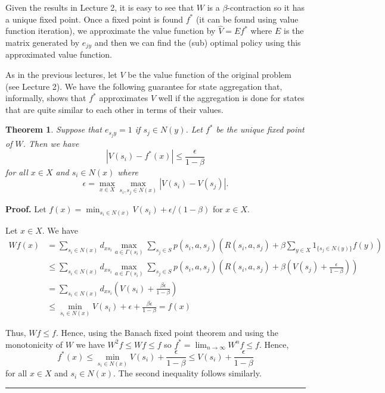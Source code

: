 \documentclass[letter,11pt]{article}
\newtheorem{theorem}{Theorem}[section]
\newenvironment {proof}[1][Proof]{\noindent \textbf {#1.} }{\ \rule {0.5em}{0.5em}}
\begin{document}
Given the results in Lecture 2, it is easy to see that $W$ is a $\beta$-contraction so it has a unique fixed point. Once a fixed point is found $f^{*}$ (it can be found using value function iteration), we approximate the value function by $ \hat{V} = Ef^{*}$ where $E$ is the matrix generated by $e_{jy}$ and then we can find the (sub) optimal policy using this approximated value function. 

As in the previous lectures, let $V$ be the value function of the original problem (see Lecture 2). We have the following guarantee for state aggregation that, informally, shows that $f^{*}$ approximates $V$ well if the aggregation is done for states that are quite similar to each other in terms of their values. 

\begin{theorem} \label{thm:state-aggregation}
    Suppose that $e_{s_{j}y} = 1$ if $s_{j} \in N(y)$.  Let $f^{*}$ be the unique fixed point of $W$. Then we have 
    $$ |V(s_{i}) - f^{*}(x)|  \leq  \frac{\epsilon}{1-\beta}  $$
for all $x \in X$ and $s_{i} \in N(x)$ where 
$$ \epsilon = \max _{x \in X} \max _{s_{i},s_{j} \in N(x) } |V(s_{i}) - V(s_{j})|.$$
\end{theorem}

\begin{proof}
    Let $f(x)= \min _{s_{i} \in N(x)} V(s_{i}) + \epsilon/(1-\beta)$ for $x \in X$. 
    
    Let $x \in X$. We have
\begin{align*}
    Wf(x) & = \sum _{s_{i} \in N(x) } d_{xs_{i}} \max _{ a \in \Gamma (s_{i})} \sum _{s_{j} \in S} p(s_{i},a,s_{j}) \left( R(s_{i},a,s_{j}) + \beta \sum _{y \in X} 1_{ \{s_{j} \in N(y) \} } f(y) \right) \\
    & \leq  \sum _{s_{i} \in N(x) } d_{xs_{i}} \max _{ a \in \Gamma (s_{i})} \sum _{s_{j} \in S} p(s_{i},a,s_{j}) \left( R(s_{i},a,s_{j}) + \beta \left ( V(s_{j}) + \frac{\epsilon } { 1- \beta} \right) \right) \\
    & =  \sum _{s_{i} \in N(x) } d_{xs_{i}} \left ( V(s_{i}) +\frac{\beta \epsilon } { 1- \beta} \right) \\ 
    & \leq \min_{s_{i} \in N(x)} V(s_{i}) + \epsilon + \frac{\beta \epsilon } { 1- \beta} = f(x)
    \end{align*}

    Thus, $Wf \leq f$. Hence, using the Banach fixed point theorem and using the monotonicity of $W$ we have $W^2 f \leq Wf \leq f$ so $f^{*} = \lim _{n \rightarrow \infty } W^{n}f \leq f$. Hence,
    $$f^{*} (x) \leq \min _{s_{i} \in N(x)} V(s_{i}) + \frac{ \epsilon } { 1- \beta} \leq V(s_{i}) + \frac{ \epsilon } { 1- \beta}$$
    for all $x \in X$ and $s_{i} \in N(x)$. The second inequality follows similarly. 
\end{proof}
\end{document}
